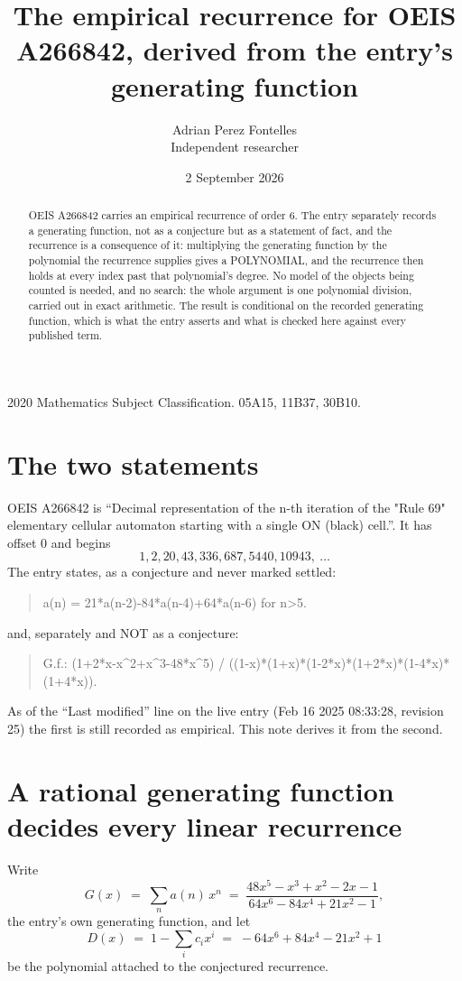 \documentclass[11pt,a4paper]{article}
\title{The empirical recurrence for OEIS A266842, derived from the entry's generating function}
\author{Adrian Perez Fontelles\\ \small Independent researcher}
\date{2 September 2026}
\theoremstyle{plain}
\theoremstyle{definition}
\begin{document}
\maketitle

\begin{abstract}
OEIS A266842 carries an empirical recurrence of order $6$. The entry separately records a
generating function, not as a conjecture but as a statement of fact, and the recurrence is a
consequence of it: multiplying the generating function by the polynomial the recurrence
supplies gives a POLYNOMIAL, and the recurrence then holds at every index past that
polynomial's degree. No model of the objects being counted is needed, and no search: the
whole argument is one polynomial division, carried out in exact arithmetic. The result is
conditional on the recorded generating function, which is what the entry asserts and what is
checked here against every published term.
\end{abstract}

\noindent\small 2020 Mathematics Subject Classification. 05A15, 11B37, 30B10.\normalsize

\section{The two statements}

OEIS A266842 is ``Decimal representation of the n-th iteration of the "Rule 69" elementary cellular automaton starting with a single ON (black) cell.''. It has offset $0$ and begins
\[
1, 2, 20, 43, 336, 687, 5440, 10943,\ \dots
\]
The entry states, as a conjecture and never marked settled:
\begin{quote}
a(n) = 21*a(n-2)-84*a(n-4)+64*a(n-6) for n>5.
\end{quote}
and, separately and NOT as a conjecture:
\begin{quote}
G.f.: (1+2*x-x\^{}2+x\^{}3-48*x\^{}5) / ((1-x)*(1+x)*(1-2*x)*(1+2*x)*(1-4*x)*(1+4*x)).
\end{quote}
As of the ``Last modified'' line on the live entry (Feb 16 2025 08:33:28, revision 25) the first is still
recorded as empirical. This note derives it from the second.

\section{A rational generating function decides every linear recurrence}

Write
\[
G(x)\;=\;\sum_{n}a(n)\,x^{n}\;=\;\frac{48 x^{5} - x^{3} + x^{2} - 2 x - 1}{64 x^{6} - 84 x^{4} + 21 x^{2} - 1},
\]
the entry's own generating function, and let
\[
D(x)\;=\;1-\sum_i c_i x^{i}\;=\;- 64 x^{6} + 84 x^{4} - 21 x^{2} + 1
\]
be the polynomial attached to the conjectured recurrence.
\end{document}
